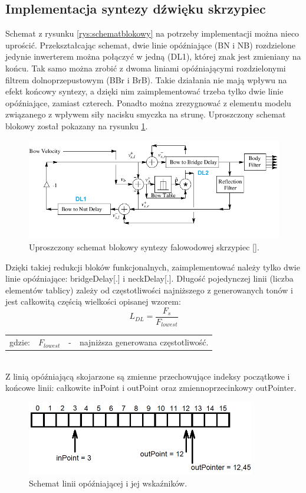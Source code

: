 \subsection{Implementacja syntezy dźwięku skrzypiec}
Schemat z rysunku \ref{rys:schematblokowy} na potrzeby implementacji można nieco uprościć. Przekształcając schemat, dwie linie opóźniające (BN i NB) rozdzielone jedynie inwerterem można połączyć w jedną (DL1), której znak jest zmieniany na końcu. Tak samo można zrobić z dwoma liniami opóźniającymi rozdzielonymi filtrem dolnoprzepustowym (BBr i BrB). Takie działania nie mają wpływu na efekt końcowy syntezy, a dzięki nim zaimplementować trzeba tylko dwie linie opóźniające, zamiast czterech. Ponadto można zrezygnować z elementu modelu związanego z wpływem siły nacisku smyczka na strunę. Uproszczony schemat blokowy został pokazany na rysunku \ref{rys:model_violin_schemat}.
\begin{figure}[H]
	\centering
	\includegraphics[width=12cm]{grafiki/model_violin_schemat}
	\captionsetup{justification=centering}
	\caption{Uproszczony schemat blokowy syntezy falowodowej skrzypiec [].}
	\label{rys:model_violin_schemat}
\end{figure}
Dzięki takiej redukcji bloków funkcjonalnych, zaimplementować należy tylko dwie linie opóźniające: bridgeDelay[.] i neckDelay[.]. Długość pojedynczej linii (liczba elementów tablicy) zależy od częstotliwości najniższego z generowanych tonów i jest całkowitą częścią wielkości opisanej wzorem:
\begin{equation} \label{equ:model_ndelays}
L_{DL} = \frac{F_s}{F_{lowest}}
\end{equation}
\begin{tabular}{ l l l l}
	gdzie: & $F_{lowest}$ &  - & najniższa generowana częstotliwość. \\
\end{tabular}\\
Z linią opóźniającą skojarzone są zmienne przechowujące indeksy początkowe i końcowe linii: całkowite inPoint i outPoint oraz zmiennoprzecinkowy outPointer. 
\begin{figure}[H]
	\centering
	\includegraphics[width=10cm]{grafiki/model_violin_wskazniki}
	\captionsetup{justification=centering}
	\caption{Schemat linii opóźniającej i jej wskaźników.}
	\label{rys:model_violin_wskazniki}
\end{figure}
